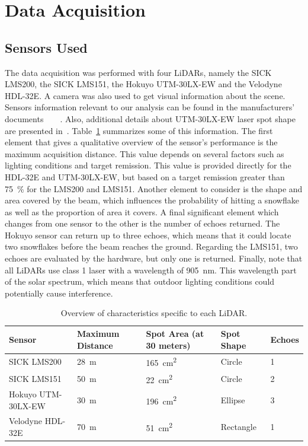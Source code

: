 \section{Data Acquisition}

\subsection{Sensors Used}
The data acquisition was performed with four LiDARs, namely the SICK LMS200, the SICK LMS151, the Hokuyo UTM-30LX-EW and the Velodyne HDL-32E. A camera was also used to get visual information about the scene. Sensors information relevant to our analysis can be found in the manufacturers' documents~\cite{VelodyneManual}~\cite{UTMDatasheet}~\cite{LMS151Datasheet}~\cite{LMS200Manual}. Also, additional details about UTM-30LX-EW laser spot shape are presented in~\cite{Mader2014}. Table~\ref{tab:lidars} summarizes some of this information. The first element that gives a qualitative overview of the sensor's performance is the maximum acquisition distance. This value depends on several factors such as lighting conditions and target remission. This value is provided directly for the HDL-32E and UTM-30LX-EW, but based on a target remission greater than \SI{75}{\percent} for the LMS200 and LMS151. Another element to consider is the shape and area covered by the beam, which influences the probability of hitting a snowflake as well as the proportion of area it covers. A final significant element which changes from one sensor to the other is the number of echoes returned. The Hokuyo sensor can return up to three echoes, which means that it could locate two snowflakes before the beam reaches the ground. Regarding the LMS151, two echoes are evaluated by the hardware, but only one is returned. Finally, note that all LiDARs use class 1 laser with a wavelength of \SI{905}{\nano\meter}. This wavelength part of the solar spectrum, which means that outdoor lighting conditions could potentially cause interference.

\begin{table}[htbp]
    \centering
    \begin{tabularx}{\linewidth}{|X|X|X|X|X|}\hline
        \textbf{Sensor}     & \textbf{Maximum Distance}  & \textbf{Spot Area (at 30 meters)}  & \textbf{Spot Shape} & \textbf{Echoes} \\ \hline
        SICK LMS200         & \SI{28}{\meter}            & \SI{165}{\centi\meter\squared}     & Circle              & 1               \\ \hline
        SICK LMS151         & \SI{50}{\meter}            & \SI{22}{\centi\meter\squared}      & Circle              & 2               \\ \hline
        Hokuyo UTM-30LX-EW  & \SI{30}{\meter}            & \SI{196}{\centi\meter\squared}     & Ellipse             & 3               \\ \hline
        Velodyne HDL-32E    & \SI{70}{\meter}            & \SI{51}{\centi\meter\squared}      & Rectangle           & 1               \\ \hline
    \end{tabularx}
    \caption{Overview of characteristics specific to each LiDAR.}\label{tab:lidars}
\end{table}

